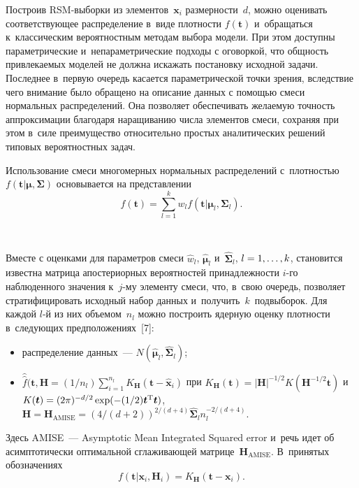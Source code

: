 \begin{multicols}{2}
     Построив RSM-выборки из элементов~$\bm{x}_i$ размерности~$d$, 
можно оценивать соответствующее распределение в~виде плотности $f(\bm{t})$ 
и~обращаться к~классическим вероятностным методам выбора модели. При 
этом доступны параметрические и~непараметрические подходы с оговоркой, 
что общность привлекаемых моделей не должна искажать постановку исходной 
задачи. Последнее в~первую очередь касается параметрической точки зрения, 
вследствие чего внимание было обращено на описание данных с помощью 
смеси нормальных распределений. Она позволяет обеспечивать желаемую 
точность аппроксимации благодаря наращиванию числа элементов смеси, 
сохраняя при этом в~силе преимущество относительно простых аналитических 
решений типовых вероятностных задач. 
     
     Использование смеси многомерных нормальных распределений  
с~плот\-ностью $f(\bm{t}\vert \bm{\mu}, \bm{\Sigma})$ основывается на 
представлении
     $$
     f(\bm{t}) =\sum\limits^k_{l=1} w_l f(\bm{t}\vert 
\bm{\mu}_l,\bm{\Sigma}_l).
     $$
     
     \begin{figure*} %
\vspace*{1pt}
\begin{center}
   \mbox{%
\epsfxsize=155.726mm 
}

\end{center}
\vspace*{-9pt}
\end{figure*}
     
     Вместе с оценками для параметров смеси $\hat{w}_l$, 
$\hat{\bm{\mu}}_l$ и~$\hat{\bm{\Sigma}}_l$, $l\hm= 1,\ldots , k$, становится 
известна матрица апостериорных вероятностей принадлежности $i$-го 
наблюденного значения к~$j$-му элементу смеси, что, в~свою очередь, 
позволяет стратифицировать исходный набор данных 
и~получить~$k$~подвыборок. Для каждой $l$-й из них объемом~$n_l$ можно 
построить ядерную оценку плотности в~следующих предположениях~[7]:
     \begin{itemize}
\item распределение данных~--- $N(\hat{\bm{\mu}}_l, \hat{\bm{\Sigma}}_l)$;
\item $\hat{\hat{f}} (\bm{t},\mathbf{H} = (1/n_l) \sum\nolimits^{n_l}_{i=1} 
K_{\mathbf{H}} (\bm{t} -\hat{\bm{x}}_i)$ при 
$K_{\mathbf{H}}(\bm{t}) =\vert \mathbf{H}\vert^{-1/2} K(\mathbf{H}^{-
1/2} \bm{t})$ и~$K(\bm{t}) \hm= (2\pi)^{-d/2}\exp (-(1/2) \bm{t}^{\mathrm{T}} 
\bm{t})$, 
 $\mathbf{H} = \mathbf{H}_{\mathrm{AMISE}} = ( 4/(d+2))^{2/(d+4)} 
\hat{\bm{\Sigma}}_l n_l^{-2/(d+4)}$.
\end{itemize}
Здесь AMISE~--- Asymptotic Mean Integrated Squared error и~речь идет об 
асимптотически оптимальной сглаживающей 
матрице~$\mathbf{H}_{\mathrm{AMISE}}$. В~принятых обозначениях 
$$
f\left( \bm{t}\vert \bm{x}_i, \mathbf{H}_i\right) =K_{\bm {H}} (\bm{t} - 
\bm{x}_i).
$$
     

\end{multicols}
